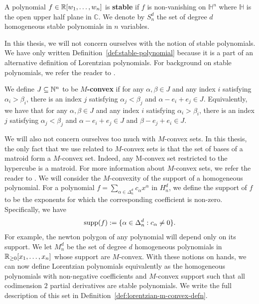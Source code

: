 \documentclass{puthesis-UG}
\begin{document}
\begin{defn} \label{def:stable-polynomial}
	A polynomial $f \in \mathbb{R}[w_1, \ldots, w_n]$ is \textbf{stable} if $f$ is non-vanishing on $\mathbb{H}^n$ where $\mathbb{H}$ is the open upper half plane in $\mathbb{C}$. We denote by $S_n^d$ the set of degree $d$ homogeneous stable polynomials in $n$ variables. 
\end{defn}

In this thesis, we will not concern ourselves with the notion of stable polynomials. We have only written Definition~\ref{def:stable-polynomial} because it is a part of an alternative definition of Lorentzian polynomials. For background on stable polynomials, we refer the reader to \cite{wagner2009multivariate}. 

\begin{defn}
	We define $J \subseteq \mathbb{N}^n$ to be \textbf{$M$-convex} if for any $\alpha, \beta \in J$ and any index $i$ satisfying $\alpha_i > \beta_i$, there is an index $j$ satisfying $\alpha_j < \beta_j$ and $\alpha - e_i + e_j \in J$. Equivalently, we have that for any $\alpha, \beta \in J$ and any index $i$ satisfying $\alpha_i > \beta_i$, there is an index $j$ satisfying $\alpha_j < \beta_j$ and $\alpha - e_i + e_j \in J$ and $\beta - e_j + e_i \in J$. 
\end{defn}

We will also not concern ourselves too much with $M$-convex sets. In this thesis, the only fact that we use related to $M$-convex sets is that the set of bases of a matroid form a $M$-convex set. Indeed, any M-convex set restricted to the hypercube is a matroid. For more information about $M$-convex sets, we refer the reader to \cite{discete-convex-analysis}. We will consider the $M$-convexity of the support of a homogeneous polynomial. For a polynomial $f = \sum_{\alpha \in \Delta_n^d} c_\alpha x^\alpha$ in $H_n^d$, we define the support of $f$ to be the exponents for which the corresponding coefficient is non-zero. Specifically, we have
\[
	\operatorname{supp} (f) := \{\alpha \in \Delta_n^d : c_\alpha \neq 0\}.
\]
For example, the newton polygon of any polynomial will depend only on its support. We let $M_n^d$ be the set of degree $d$ homogeneous polynomials in $\mathbb{R}_{\geq 0} [x_1, \ldots, x_n]$ whose support are $M$-convex. With these notions on hands, we can now define Lorentzian polynomials equivalently as the homogeneous polynomials with non-negative coefficients and $M$-convex support such that all codimension $2$ partial derivatives are stable polynomials. We write the full description of this set in Definition~\ref{def:lorentzian-m-convex-defn}. 
\end{document}
